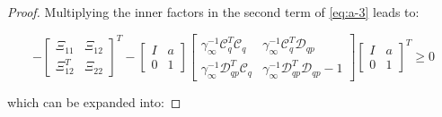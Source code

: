 \begin{proof}
	Multiplying the inner factors in the second term of \autoref{eq:a-3} leads to:
	
	\begin{equation*}
		-\begin{bmatrix}
			\Xi_{11} & \Xi_{12} \\
			\Xi_{12}^T & \Xi_{22}
		\end{bmatrix}^T -
		\begin{bmatrix}
			I & a \\
			0 & 1
		\end{bmatrix}
		\begin{bmatrix}
			\gamma_\infty^{-1}\mathcal{C}_q^T\mathcal{C}_q & \gamma_\infty^{-1}\mathcal{C}_q^T\mathcal{D}_{qp} \\
			\gamma_\infty^{-1}\mathcal{D}_{qp}^T\mathcal{C}_q & \gamma_\infty^{-1}\mathcal{D}_{qp}^T\mathcal{D}_{qp} - 1
		\end{bmatrix}
		\begin{bmatrix} 
			I & a \\
			0 & 1
		\end{bmatrix}^T
		\geq 0
	\end{equation*}

	which can be expanded into:
	

\end{proof}
